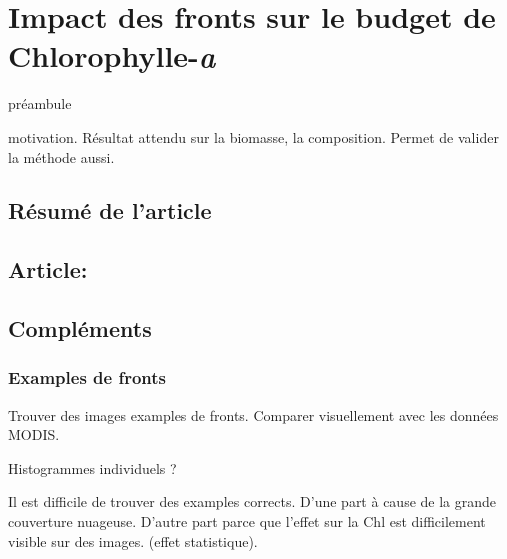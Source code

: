 \documentclass[index]{subfiles}
\begin{document}
\chapter{Impact des fronts sur le budget de Chlorophylle-\emph{a}}
\label{chp:res-chl}

\tocsubfile%

préambule

motivation.
Résultat attendu sur la biomasse, la composition.
Permet de valider la méthode aussi.

\section{Résumé de l'article}
\label{sec:resume-article}

\section[Article]{Article: \articleTitle{}}
\label{sec:article-bg}

\section{Compléments}
\label{sec:complements-chl}

\subsection{Examples de fronts}
\label{sec:examples-fronts}

Trouver des images examples de fronts.
Comparer visuellement avec les données MODIS.

Histogrammes individuels ?

Il est difficile de trouver des examples corrects.
D'une part à cause de la grande couverture nuageuse.
D'autre part parce que l'effet sur la Chl est difficilement visible sur des images. (effet statistique).
\end{document}
